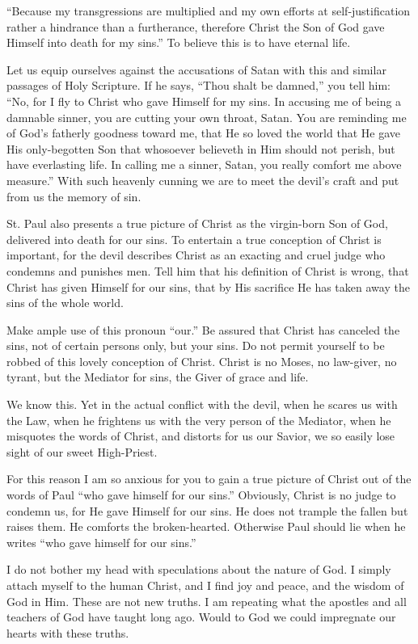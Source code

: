 “Because my transgressions are multiplied and my own efforts at self-justification rather a hindrance than a furtherance, therefore Christ the Son of God gave Himself into death for my sins.” To believe this is to have eternal life.

Let us equip ourselves against the accusations of Satan with this and similar passages of Holy Scripture. If he says, “Thou shalt be damned,” you tell him: “No, for I fly to Christ who gave Himself for my sins. In accusing me of being a damnable sinner, you are cutting your own throat, Satan. You are reminding me of God’s fatherly goodness toward me, that He so loved the world that He gave His only-begotten Son that whosoever believeth in Him should not perish, but have everlasting life. In calling me a sinner, Satan, you really comfort me above measure.” With such heavenly cunning we are to meet the devil’s craft and put from us the memory of sin.

St. Paul also presents a true picture of Christ as the virgin-born Son of God, delivered into death for our sins. To entertain a true conception of Christ is important, for the devil describes Christ as an exacting and cruel judge who condemns and punishes men. Tell him that his definition of Christ is wrong, that Christ has given Himself for our sins, that by His sacrifice He has taken away the sins of the whole world.

Make ample use of this pronoun “our.” Be assured that Christ has canceled the sins, not of certain persons only, but your sins. Do not permit yourself to be robbed of this lovely conception of Christ. Christ is no Moses, no law-giver, no tyrant, but the Mediator for sins, the Giver of grace and life.

We know this. Yet in the actual conflict with the devil, when he scares us with the Law, when he frightens us with the very person of the Mediator, when he misquotes the words of Christ, and distorts for us our Savior, we so easily lose sight of our sweet High-Priest.

For this reason I am so anxious for you to gain a true picture of Christ out of the words of Paul “who gave himself for our sins.” Obviously, Christ is no judge to condemn us, for He gave Himself for our sins. He does not trample the fallen but raises them. He comforts the broken-hearted. Otherwise Paul should lie when he writes “who gave himself for our sins.”

I do not bother my head with speculations about the nature of God. I simply attach myself to the human Christ, and I find joy and peace, and the wisdom of God in Him. These are not new truths. I am repeating what the apostles and all teachers of God have taught long ago. Would to God we could impregnate our hearts with these truths.

